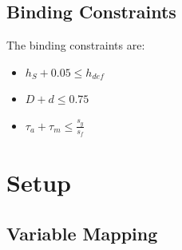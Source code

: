\documentclass{article}
\begin{document}
\subsection{Binding Constraints}
The binding constraints are:
\begin{itemize}
    \item $h_{S} + 0.05 \leq h_{def}$
    \item $D + d \leq 0.75$
    \item $\tau_{a} + \tau_{m} \leq \frac{s_{y}}{s_{f}}$
\end{itemize}


\newpage
\section{Setup}
\subsection{Variable Mapping}
\end{document}
